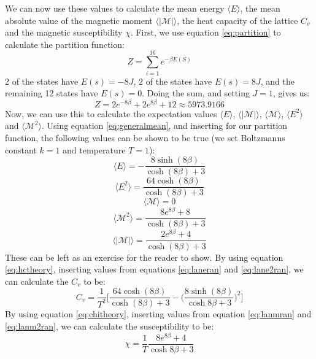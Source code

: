 \documentclass[reprint,english,notitlepage]{revtex4-1}  %
\begin{document}
\begin{appendix}
We can now use these values to calculate the mean energy $\langle E \rangle$, the mean absolute value of the magnetic moment $\langle | \mathcal{M} | \rangle$, the heat capacity of the lattice $C_v$ and the magnetic susceptibility $\chi$. First, we use equation \ref{eq:partition} to calculate the partition function:
$$
Z = \sum\limits_{i=1}^{16} e^{-\beta E(S)}
$$
2 of the states have $E(s) = -8J$, 2 of the states have $E(s) = 8J$, and the remaining 12 states have $E(s) = 0$. Doing the sum, and setting $J = 1$, gives us:
$$
Z = 2e^{-8\beta} + 2e^{8\beta} + 12 \approx 5973.9166 
$$
Now, we can use this to calculate the expectation values $\langle E \rangle$, $\langle |\mathcal{M}|\rangle$, $\langle \mathcal{M}\rangle$, $\langle E^2 \rangle$ and $\langle \mathcal{M}^2\rangle$. Using equation \ref{eq:generalmean}, and inserting for our partition function, the following values can be shown to be true (we set Boltzmanns constant $k = 1$ and temperature $T = 1$):
\begin{equation}\label{eq:laneran}
    \langle E \rangle = -\frac{8\sinh{(8\beta)}}{\cosh{(8\beta)}+3}
\end{equation}
\begin{equation}\label{eq:lane2ran}
    \langle E^2\rangle = \frac{64\cosh{(8\beta)}}{\cosh{(8\beta)}+3}
\end{equation}
\begin{equation}\label{eq:lanmran}
    \langle \mathcal{M} \rangle = 0
\end{equation}
\begin{equation}\label{eq:lanm2ran}
    \langle \mathcal{M}^2 \rangle = \frac{8e^{8\beta}+8}{\cosh{(8\beta)}+3}
\end{equation}
\begin{equation}
    \langle |\mathcal{M}|\rangle = \frac{2e^{8\beta}+4}{\cosh{(8\beta)}+3}
\end{equation}
These can be left as an exercise for the reader to show. By using equation \ref{eq:hctheory}, inserting values from equations \ref{eq:laneran} and \ref{eq:lane2ran}, we can calculate the $C_v$ to be:
\begin{equation}
    C_v = \frac{1}{T^2}\Bigg[\frac{64\cosh{(8\beta)}}{\cosh{(8\beta)}+3}-\bigg(\frac{8\sinh{(8\beta)}}{\cosh{8\beta + 3}}\bigg)^2\Bigg]
\end{equation}
By using equation \ref{eq:chitheory}, inserting values from equation \ref{eq:lanmran} and \ref{eq:lanm2ran}, we can calculate the susceptibility to be:
\begin{equation}
    \chi = \frac{1}{T}\frac{8e^{8\beta}+4}{\cosh{8\beta}+3}

\end{equation}
\end{appendix}
\end{document}
